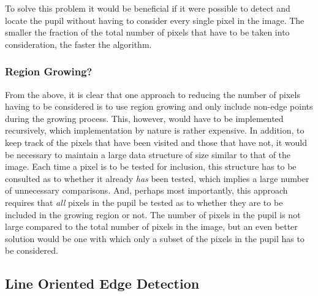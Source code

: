 To solve this problem it would be beneficial if it were possible to
detect and locate the pupil without having to consider every single
pixel in the image.  The smaller the fraction of the total number of
pixels that have to be taken into consideration, the faster the
algorithm.  

\subsubsection{Region Growing?}

From the above, it is clear that one approach to reducing the number
of pixels having to be considered is to use region growing and only
include non-edge points during the growing process.  This, however,
would have to be implemented recursively, which implementation by
nature is rather expensive.  In addition, to keep track of the pixels
that have been visited and those that have not, it would be necessary
to maintain a large data structure of size similar to that of the
image.  Each time a pixel is to be tested for inclusion, this
structure has to be consulted as to whether it already {\em has\/}
been tested, which implies a large number of unnecessary comparisons.
And, perhaps most importantly, this approach requires that {\em all\/}
pixels in the pupil be tested as to whether they are to be included in
the growing region or not.  The number of pixels in the pupil is not
large compared to the total number of pixels in the image, but an even
better solution would be one with which only a subset of the pixels in
the pupil has to be considered.

\subsection{Line Oriented Edge Detection}
\label{eval:approach:edge}


